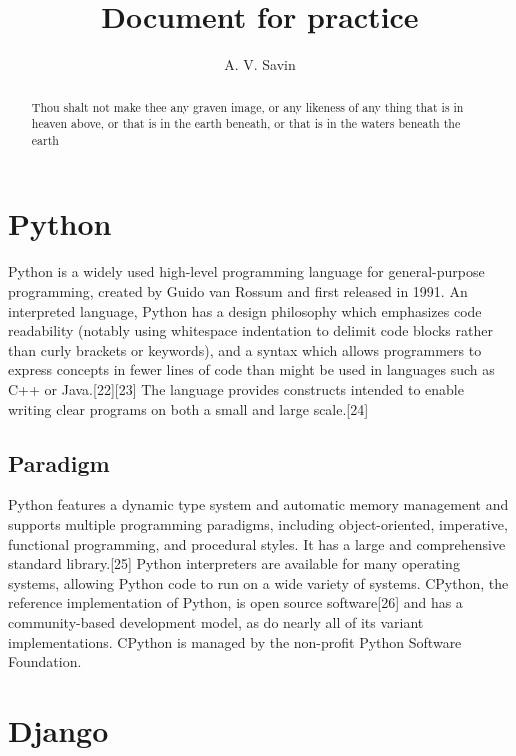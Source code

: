 \documentclass{article}
\begin{document}
\tableofcontents

\title{Document for practice}
\author{A. V. Savin}
\date{}
\maketitle

\begin{abstract}
Thou shalt not make thee any graven image, or any likeness of any thing that is in heaven above, or that is in the earth beneath, or that is in the waters beneath the earth
\end{abstract}

\section{Python}

{\setlength{\parindent}{1cm}}Python is a widely used high-level programming language for general-purpose programming, created by Guido van Rossum and first released in 1991. An interpreted language, Python has a design philosophy which emphasizes code readability (notably using whitespace indentation to delimit code blocks rather than curly brackets or keywords), and a syntax which allows programmers to express concepts in fewer lines of code than might be used in languages such as C++ or Java.[22][23] The language provides constructs intended to enable writing clear programs on both a small and large scale.[24]

\subsection[Some facts about Python]{Paradigm}{\setlength{\parindent}{1cm}}

Python features a dynamic type system and automatic memory management and supports multiple programming paradigms, including object-oriented, imperative, functional programming, and procedural styles. It has a large and comprehensive standard library.[25]
{\setlength{\parindent}{1cm}}
Python interpreters are available for many operating systems, allowing Python code to run on a wide variety of systems. CPython, the reference implementation of Python, is open source software[26] and has a community-based development model, as do nearly all of its variant implementations. CPython is managed by the non-profit Python Software Foundation.

\section{Django}{\setlength{\parindent}{1cm}}
\end{document}
